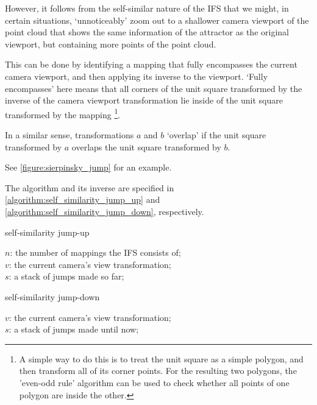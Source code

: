 \documentclass[11pt]{article}
\begin{document}
However, it follows from the self-similar nature of the IFS that we might, in certain situations,
`unnoticeably' zoom out to a shallower camera viewport of the point cloud that shows the same information of the attractor
as the original viewport, but containing more points of the point cloud.

This can be done by identifying a mapping that fully encompasses the current camera viewport, and then applying its inverse
to the viewport.
`Fully encompasses' here means that 
all corners of the unit square transformed by the inverse of the camera viewport transformation
lie inside of the unit square transformed by the mapping \footnote{A simple way to do this is to treat the unit square as a simple polygon,
and then transform all of its corner points. For the resulting two polygons, the 'even-odd rule' algorithm
\cite{haines1994point}
can be used to check whether all points of one polygon are inside the other.}.

In a similar sense, transformations \(a\) and \(b\) `overlap' if the unit square transformed by \(a\) overlaps the unit square transformed by \(b\).

See \autoref{figure:sierpinsky_jump} for an example. 

The algorithm and its inverse are specified in \autoref{algorithm:self_similarity_jump_up} and \autoref{algorithm:self_similarity_jump_down}, respectively.

\begin{algorithm}
\caption{self-similarity jump-up}
\label{algorithm:self_similarity_jump_up}
  $n$: the number of mappings the IFS consists of; \\
  $v$: the current camera's view transformation; \\
  $s$: a stack of jumps made so far; \\
\end{algorithm}

\begin{algorithm}
\caption{self-similarity jump-down}
\label{algorithm:self_similarity_jump_down}
  $v$: the current camera's view transformation; \\
  $s$: a stack of jumps made until now; \\
\end{algorithm}
\end{document}
